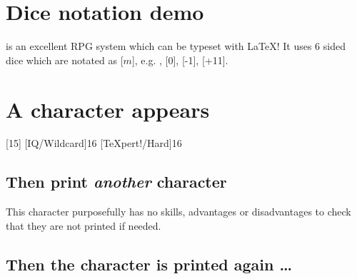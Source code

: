 \documentclass{article}
\begin{document}
\tableofcontents

\section{Dice notation demo}
\label{sec:dice-notation-demo}

\gurps is an excellent RPG system which can be typeset with \LaTeX{}! It uses 6
sided dice which are notated as [$m$], e.g. , [0], [-1], [+11].

\section{A character appears}
\label{sec:character-appears}

\begin{character}
  [15]
  [IQ/Wildcard]{16}
  [\TeX pert!/Hard]{16}

\end{character}

\subsection{Then print \emph{another} character }
\label{sec:then-print-emph}

This character purposefully has no skills, advantages or disadvantages to check
that they are not printed if needed.

\begin{character}
\end{character}

\subsection{Then the character is printed again \ldots{}}
\label{sec:then-char-prepr}
\end{document}
